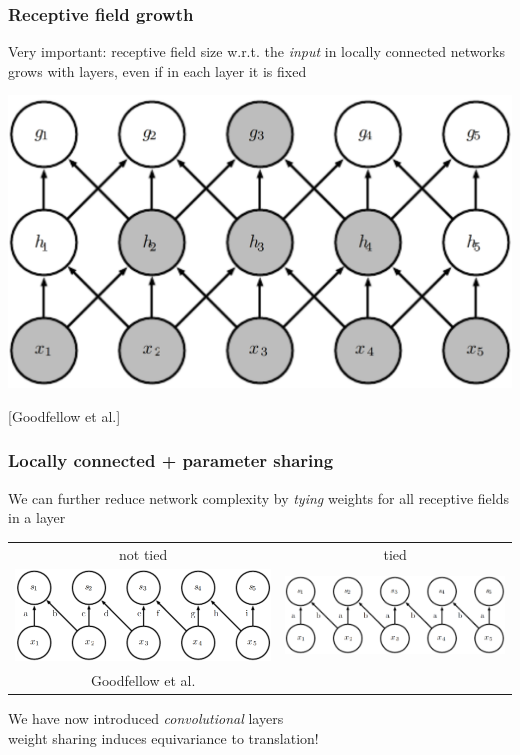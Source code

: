 \documentclass[xcolor=dvipsnames]{beamer}
\begin{document}
\begin{frame}
  \frametitle{Receptive field growth}
  \bi
\item Very important: receptive field size w.r.t. the \emph{input} in locally connected
  networks grows with layers, even if in each layer it is fixed
\ei

\includegraphics[width=.48\textwidth]{gcb-rf-ill}

[Goodfellow et al.]
\end{frame}

\begin{frame}
  \frametitle{Locally connected + parameter sharing}
  \bi
\item We can further reduce network complexity by \emph{tying} weights
  for all receptive fields in a layer
\ei
  \begin{tabular}{cc}
    not tied & tied\\
    \includegraphics[width=.48\textwidth]{gcb-locallyconn}&
    \includegraphics[width=.48\textwidth]{gcb-convconn}\\
Goodfellow et al. &
  \end{tabular}
\bi
\item We have now introduced \emph{convolutional} layers\\
weight sharing induces equivariance to translation!
\ei
\end{frame}
\end{document}
